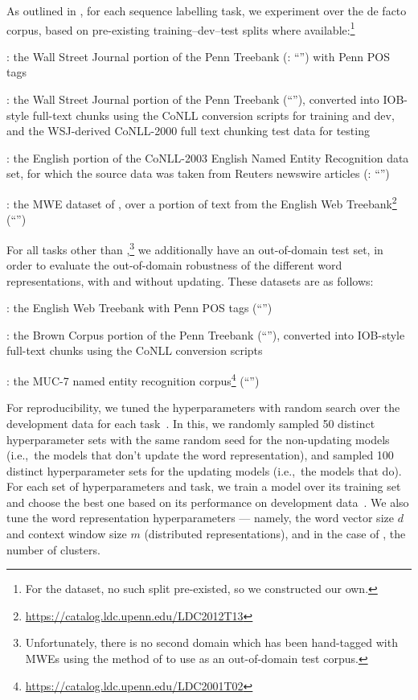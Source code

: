 As outlined in , for each sequence labelling task, we
experiment over the de facto corpus, based on pre-existing
training--dev--test splits where available:\footnote{For the \mwe
  dataset, no such split pre-existed, so we constructed our own.}
\begin{compactenum}
\item[\textbf{\pos}:] the Wall Street Journal portion of the Penn
  Treebank (: ``\WSJ'')
  with Penn POS tags
\item[\textbf{\chunking}:] the Wall Street Journal portion of the Penn
  Treebank (``\WSJ''),
  converted into IOB-style full-text chunks using the CoNLL conversion
  scripts for training and dev, and the WSJ-derived CoNLL-2000 full text chunking
  test data for testing \cite{TjongKimSang:Buchholz:2000}
\item[\textbf{\ner}:] the English portion of the CoNLL-2003 English Named Entity Recognition
  data set, for which the source data was taken from Reuters newswire
  articles (: ``\Reuters'')
\item[\textbf{\mwe}:] the MWE dataset of , over a portion of text from the
  English Web Treebank\footnote{\url{https://catalog.ldc.upenn.edu/LDC2012T13}} (``\EWT'')
\end{compactenum}
 For all tasks other
than \mwe,\footnote{Unfortunately, there is no
  second domain which has been hand-tagged with MWEs using the method of
   to use as an out-of-domain test corpus.} we
additionally have an out-of-domain test set, in order to evaluate the
out-of-domain robustness of the different word representations, with and
without updating. These datasets are as follows:
\begin{compactenum}
\item[\textbf{\pos}:] the English Web Treebank with Penn POS tags (``\EWT'')
\item[\textbf{\chunking}:] the Brown Corpus portion of the Penn
  Treebank (``\Brown''), 
  converted into IOB-style full-text chunks using the CoNLL conversion
  scripts
\item[\textbf{\ner}:] the MUC-7 named entity recognition corpus\footnote{\url{https://catalog.ldc.upenn.edu/LDC2001T02}} (``\MUC'')
\end{compactenum}

For reproducibility, we tuned the hyperparameters with random search
over the development data for each task~\cite{bergstra2012random}. 
In this, we randomly sampled 50 distinct hyperparameter sets with the
same random seed for the non-updating models (i.e.,\ the models that
don't update the word representation), and
sampled 100 distinct hyperparameter sets for the updating models (i.e.,\
the models that do). 
For each set of hyperparameters and task, we train a model over its
training set and choose the best one based on its performance on development data~\cite{turian2010word}. 
We also tune the word representation hyperparameters --- namely, the word
vector size $d$ and context window size $m$ (distributed
representations), and in the case of \Brown, the number of clusters.

